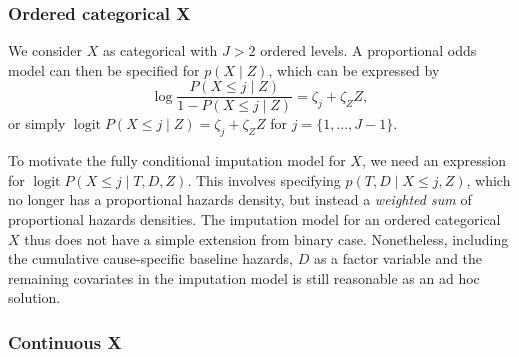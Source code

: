 \documentclass[
  letterpaper,
  DIV=11,
  numbers=noendperiod]{scrreprt}
\DeclareMathOperator{\logit}{logit}
\begin{document}
\hypertarget{ordered-categorical-x-1}{%
\subsubsection{Ordered categorical X}\label{ordered-categorical-x-1}}

We consider \(X\) as categorical with \(J>2\) ordered levels. A
proportional odds model can then be specified for \(p(X \mid Z)\), which
can be expressed by \begin{equation*}
    \log \frac{P(X \leq j \mid Z)}{1 - P(X \leq j \mid Z)} = \zeta_{j} + \zeta_Z Z,
\end{equation*} or simply
\(\logit P(X \leq j \mid Z) = \zeta_{j} + \zeta_Z Z\) for
\(j = \{1,...,J-1\}\).

To motivate the fully conditional imputation model for \(X\), we need an
expression for \(\logit P(X \leq j \mid T,D,Z)\). This involves
specifying \(p(T, D \mid X \leq j,Z)\), which no longer has a
proportional hazards density, but instead a \textit{weighted sum} of
proportional hazards densities. The imputation model for an ordered
categorical \(X\) thus does not have a simple extension from binary
case. Nonetheless, including the cumulative cause-specific baseline
hazards, \(D\) as a factor variable and the remaining covariates in the
imputation model is still reasonable as an ad hoc solution.

\hypertarget{continuous-x-1}{%
\subsubsection{Continuous X}\label{continuous-x-1}}
\end{document}
